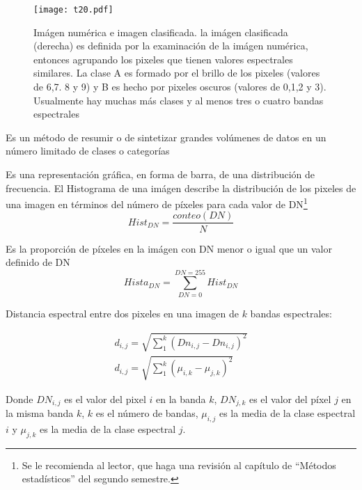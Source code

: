   \begin{figure}[h!]
  \centering
    \texttt{[image: t20.pdf]}
    \caption{Imágen numérica e imagen clasificada. la imágen clasificada (derecha) es definida por la examinación de la imágen numérica, entonces agrupando los pixeles que tienen valores espectrales similares. La clase A es formado por el brillo de los pixeles (valores de 6,7. 8 y 9) y B es hecho por pixeles oscuros (valores de 0,1,2 y 3). Usualmente hay muchas más clases y al menos tres o cuatro bandas espectrales}
    \label{t20}
  \end{figure}
  
  \begin{definition}
      Es un método de resumir o de sintetizar grandes volúmenes de datos en un número limitado de clases o categorías
  \end{definition}
  
  \begin{definition}[Histrograma]
      Es una representación gráfica, en forma de barra, de una distribución de frecuencia. El Histograma de una imágen describe la distribución de los pixeles de una imagen en términos del número de píxeles para cada valor de DN\footnote{Se le recomienda al lector, que haga una revisión al capítulo de ``Métodos estadísticos'' del segundo semestre.}
      \begin{equation}
          Hist_{DN} = \frac{conteo(DN)}{N} 
      \end{equation}
  \end{definition}
  
  \begin{definition}
      Es la proporción de píxeles en la imágen con DN menor o igual que un valor definido de DN
      \begin{equation}
          Hista_{DN} =\sum_{DN = 0}^{DN = 255} Hist_{DN}
      \end{equation}
  \end{definition}

Distancia espectral entre dos pixeles en una imagen de $k$ bandas espectrales:

\begin{align}
  d_{i,j} = \sqrt{ \sum_{1}^{k} \left(Dn_{i,j} - Dn_{i,j}\right)^2}\\
  d_{i,j} = \sqrt{ \sum_{1}^{k} \left(\mu_{i,k} - \mu_{j,k}\right)^2}
\end{align}

Donde $DN_{i,j}$ es el valor del pixel $i$ en la banda $k$, $DN_{j,k}$ es el valor del píxel $j$ en la misma banda $k$,
$k$ es el número de bandas, $\mu_{i,j}$ es la media de la clase espectral $i$ y $\mu_{j,k}$ es la media de la clase espectral $j$.

